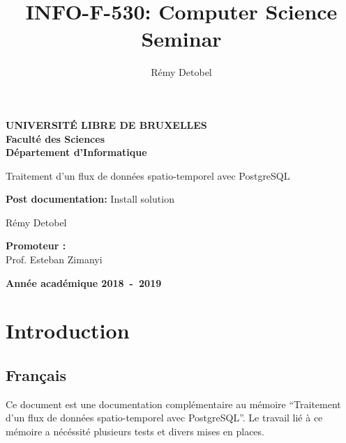 \documentclass[a4paper,12pt]{article}
\title{INFO-F-530: Computer Science Seminar}
\author{Rémy Detobel}
\begin{document}
\begin{titlepage}
\begin{center}
\textbf{UNIVERSIT\'E LIBRE DE BRUXELLES}\\
\textbf{Faculté des Sciences}\\
\textbf{Département d'Informatique}
\vfill{}\vfill{}

{\Huge  Traitement d'un flux de données \vspace*{.5cm}  \linebreak[4] spatio-temporel avec PostgreSQL}

{\Huge \par \vspace*{1cm}}
\begin{center}{\LARGE \textbf{Post documentation:} Install solution}\end{center}{\Huge \par}

{\Huge \par}
\begin{center}{\LARGE Rémy Detobel}\end{center}{\Huge \par}
\vfill{}\vfill{}
\begin{flushright}{\large \textbf{Promoteur :}}\\
{\large Prof. Esteban Zimanyi}\end{flushright}{\large\par}
\vfill{}\vfill{}\enlargethispage{3cm}
\textbf{Année académique 2018~-~2019}
\end{center}
\end{titlepage}
\newpage

\tableofcontents
\newpage

\section{Introduction}

    \subsection{Français}
        Ce document est une documentation complémentaire au mémoire ``Traitement d'un flux de données spatio-temporel avec PostgreSQL''. Le travail lié à ce mémoire a nécéssité plusieurs tests et divers mises en places.\\
        
\end{document}
